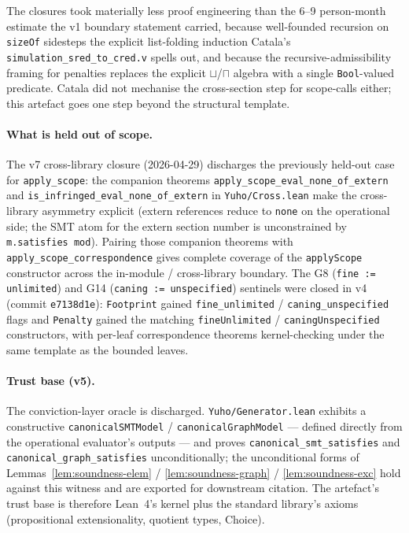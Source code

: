 The closures took materially less proof engineering than the
6--9 person-month estimate the v1 boundary statement carried,
because well-founded recursion on \texttt{sizeOf} sidesteps the
explicit list-folding induction Catala's
\texttt{simulation\_sred\_to\_cred.v} spells out, and because the
recursive-admissibility framing for penalties replaces the
explicit \texttt{$\sqcup$}/\texttt{$\sqcap$} algebra with a
single \texttt{Bool}-valued predicate. Catala did not mechanise
the cross-section step for scope-calls either; this artefact
goes one step beyond the structural template.

\paragraph{What is held out of scope.} The v7 cross-library
closure (2026-04-29) discharges the previously held-out case
for \texttt{apply\_scope}: the companion theorems
\texttt{apply\_scope\_eval\_none\_of\_extern} and
\texttt{is\_infringed\_eval\_none\_of\_extern} in
\texttt{Yuho/Cross.lean} make the cross-library asymmetry
explicit (extern references reduce to \texttt{none} on the
operational side; the SMT atom for the extern section number
is unconstrained by \texttt{m.satisfies mod}). Pairing those
companion theorems with \texttt{apply\_scope\_correspondence}
gives complete coverage of the \texttt{applyScope} constructor
across the in-module / cross-library boundary. The G8
(\texttt{fine := unlimited}) and G14 (\texttt{caning :=
unspecified}) sentinels were closed in v4 (commit
\texttt{e7138d1e}): \texttt{Footprint} gained
\texttt{fine\_unlimited} / \texttt{caning\_unspecified} flags
and \texttt{Penalty} gained the matching \texttt{fineUnlimited}
/ \texttt{caningUnspecified} constructors, with per-leaf
correspondence theorems kernel-checking under the same template
as the bounded leaves.

\paragraph{Trust base (v5).} The conviction-layer oracle is
discharged. \texttt{Yuho/Generator.lean} exhibits a constructive
\texttt{canonicalSMTModel} / \texttt{canonicalGraphModel} ---
defined directly from the operational evaluator's outputs --- and
proves \texttt{canonical\_smt\_satisfies} and
\texttt{canonical\_graph\_satisfies} unconditionally; the
unconditional forms of Lemmas~\ref{lem:soundness-elem} /
\ref{lem:soundness-graph} / \ref{lem:soundness-exc} hold against
this witness and are exported for downstream citation. The
artefact's trust base is therefore Lean~4's kernel plus the
standard library's axioms (propositional extensionality,
quotient types, Choice).

